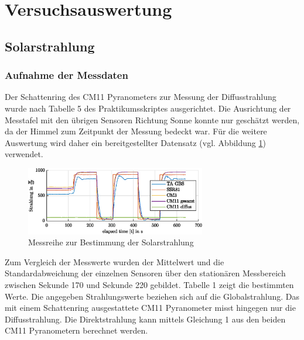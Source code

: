 \section{Versuchsauswertung}

\subsection{Solarstrahlung} 

\subsubsection{Aufnahme der Messdaten}

Der Schattenring des CM11 Pyranometers zur Messung der Diffusstrahlung wurde nach Tabelle 5 des Praktikumsskriptes ausgerichtet. Die Ausrichtung der Messtafel mit den übrigen Sensoren Richtung Sonne konnte nur geschätzt werden, da der Himmel zum Zeitpunkt der Messung bedeckt war. Für die weitere Auswertung wird daher ein bereitgestellter Datensatz (vgl. Abbildung \ref{fig:radiation}) verwendet.

\begin{figure}[H]
	\centering
	\includegraphics[width=0.7\textwidth]{../DATA/Messreihe_Strahlung.eps}
	\caption[Messreihe zur Bestimmung der Solarstrahlung]{Messreihe zur Bestimmung der Solarstrahlung}
	\label{fig:radiation}
\end{figure}
Zum Vergleich der Messwerte wurden der Mittelwert und die Standardabweichung der einzelnen Sensoren über den stationären Messbereich zwischen Sekunde 170 und Sekunde 220 gebildet. Tabelle 1 zeigt die bestimmten Werte. Die angegeben Strahlungswerte beziehen sich auf die Globalstrahlung. Das mit einem Schattenring ausgestattete CM11 Pyranometer misst hingegen nur die Diffusstrahlung. Die Direktstrahlung kann mittels  Gleichung 1 aus den beiden CM11 Pyranometern berechnet werden.

